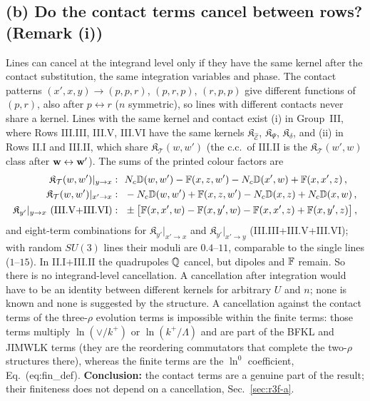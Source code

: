 \subsection{(b) Do the contact terms cancel between rows? (Remark (i))}\label{sec:r3f-b}
 Lines can cancel at the integrand level only if they have the same kernel after the contact substitution, the same integration variables and phase. The contact patterns $(x',x,y)\to(p,p,r)$, $(p,r,p)$, $(r,p,p)$ give different functions of $(p,r)$, also after $p\leftrightarrow r$ ($n$ symmetric), so lines with different contacts never share a kernel. Lines with the same kernel and contact exist (i) in Group~III, where Rows III.III, III.V, III.VI have the same kernels $\mathfrak K_{\widehat{\mathcal E}}$, $\mathfrak K_\Psi$, $\mathfrak K_\delta$, and (ii) in Rows II.I and III.II, which share $\mathfrak K_{\mathcal T}(w,w')$ (the c.c.\ of III.II is the $\mathfrak K_{\mathcal T}(w',w)$ class after $\mathbf{w}\leftrightarrow\mathbf{w}'$). The sums of the printed colour factors are
\begin{align}
\mathfrak K_{\mathcal T}(w,w')|_{y\to x}:&\ \ N_c\mathbb{D}(w,w')-\mathbb{F}(x,z,w')-N_c\mathbb{D}(x',w)+\mathbb{F}(x,x',z)\,,\notag\\
\mathfrak K_{\mathcal T}(w,w')|_{x'\to x}:&\ \ -N_c\mathbb{D}(w,w')+\mathbb{F}(x,z,w')-N_c\mathbb{D}(x,z)+N_c\mathbb{D}(x,w)\,,\notag\\
\mathfrak K_{y'}|_{y\to x}\ \text{(III.V+III.VI)}:&\ \ \pm\big[\mathbb{F}(x,x',w)-\mathbb{F}(x,y',w)-\mathbb{F}(x,x',z)+\mathbb{F}(x,y',z)\big]\,,
\end{align}
and eight-term combinations for $\mathfrak K_{y'}|_{x'\to x}$ and $\mathfrak K_{y'}|_{x'\to y}$ (III.III+III.V+III.VI); with random $SU(3)$ lines their moduli are $0.4$--$11$, comparable to the single lines ($1$--$15$). In II.I$+$III.II the quadrupoles $\mathbb{Q}$ cancel, but dipoles and $\mathbb{F}$ remain. So there is no integrand-level cancellation. A cancellation after integration would have to be an identity between different kernels for arbitrary $U$ and $n$; none is known and none is suggested by the structure. A cancellation against the contact terms of the three-$\rho$ evolution terms is impossible within the finite terms: those terms multiply $\ln(\vee/k^+)$ or $\ln(k^+/\Lambda)$ and are part of the BFKL and JIMWLK terms (they are the reordering commutators that complete the two-$\rho$ structures there), whereas the finite terms are the $\ln^0$ coefficient, Eq.~(eq:fin\_def). \textbf{Conclusion:} the contact terms are a genuine part of the result; their finiteness does not depend on a cancellation, Sec.~\ref{sec:r3f-a}.

